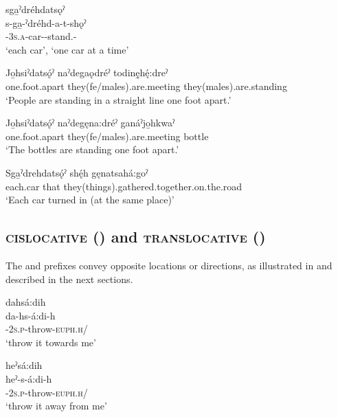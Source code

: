 \newpage
\ex sga̱ˀdréhdatsǫˀ \\
\gll s-ga̱-ˀdréhd-a-t-shǫˀ\\
{\repetitive}-\textsc{3s.a}-car-{\joinerA}-stand.{\stat}-{\pluralizer}\\
\glt ‘each car’, `one car at a time'

\ex
\gll Jo̱hsiˀdatsǫ́ˀ naˀdegaǫdréˀ todinę̱hę́:dreˀ\\
one.foot.apart they(fe/males).are.meeting they(males).are.standing\\
\glt ‘People are standing in a straight line one foot apart.’ 

\ex
\gll Jo̱hsiˀdatsǫ́ˀ naˀdegęna:dréˀ ganáˀjo̱hkwaˀ\\
one.foot.apart they(fe/males).are.meeting bottle\\
\glt ‘The bottles are standing one foot apart.’ 

\ex
\gll Sga̱ˀdrehdatsǫ́ˀ shę́h gęnatsahá:goˀ \\
each.car that they(things).gathered.together.on.the.road\\
\glt ‘Each car turned in (at the same place)’
\z
\z


\subsection{ \textsc{cislocative} ({\cislocative}) and  \textsc{translocative} ({\translocative})} \label{[d-] (cislocative) and [heˀ-] (translocative)}
The  {\cislocative} and  \textsc{\translocative} prefixes convey opposite locations or directions, as illustrated in  and described in the next sections.

\ea\label{ex:dhex}

\ea dahsá:dih\\
\gll da-hs-á:di-h\\
{\cislocative}-\textsc{2s.p}-throw-\textsc{euph.h}/{\noaspect}\\
\glt `throw it towards me'

\ex heˀsá:dih\\
\gll heˀ-s-á:di-h\\
{\translocative}-\textsc{2s.p}-throw-\textsc{euph.h}/{\noaspect}\\
\glt `throw it away from me'
\z
\z

